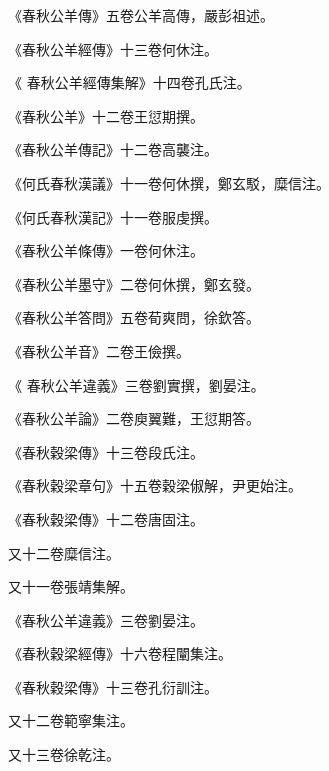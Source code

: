 \begin{pinyinscope}
 《春秋公羊傳》五卷公羊高傳，嚴彭祖述。



 《春秋公羊經傳》十三卷何休注。



 《
 春秋公羊經傳集解》十四卷孔氏注。



 《春秋公羊》十二卷王愆期撰。



 《春秋公羊傳記》十二卷高襲注。



 《何氏春秋漢議》十一卷何休撰，鄭玄駁，糜信注。



 《何氏春秋漢記》十一卷服虔撰。



 《春秋公羊條傳》一卷何休注。



 《春秋公羊墨守》二卷何休撰，鄭玄發。



 《春秋公羊答問》五卷荀爽問，徐欽答。



 《春秋公羊音》二卷王儉撰。



 《
 春秋公羊違義》三卷劉實撰，劉晏注。



 《春秋公羊論》二卷庾翼難，王愆期答。



 《春秋穀梁傳》十三卷段氏注。



 《春秋穀梁章句》十五卷穀梁俶解，尹更始注。



 《春秋穀梁傳》十二卷唐固注。



 又十二卷糜信注。



 又十一卷張靖集解。



 《春秋公羊違義》三卷劉晏注。



 《春秋穀梁經傳》十六卷程闡集注。



 《春秋穀梁傳》十三卷孔衍訓注。



 又十二卷範寧集注。



 又十三卷徐乾注。




\end{pinyinscope}
